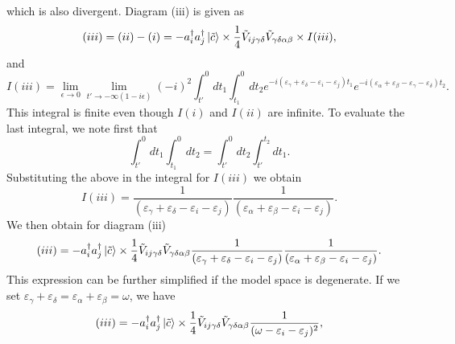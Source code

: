 which is also divergent.  Diagram (iii) is given as
\begin{equation}
   (iii)=(ii)-(i)=
    -a_{i}^{\dagger}a_{j}^{\dagger}
	       \left| \tilde{c} \right\rangle\times\frac{1}{4}\tilde{V}_{ij\gamma\delta}
               \tilde{V}_{\gamma\delta\alpha\beta}\times I(iii),
\end{equation}
and
\begin{equation}
  I(iii)=
  \lim_{\epsilon \rightarrow 0}
   \lim_{t'\rightarrow -\infty (1-i\epsilon )}
   {\displaystyle (-i)^2
   \int_{t'}^{0}dt_1  \int_{t_1}^{0}dt_2}
   e^{-i(\varepsilon_{\gamma}+\varepsilon_{\delta}-\varepsilon_{i}
   -\varepsilon_{j})t_1}
      e^{-i(\varepsilon_{\alpha}+\varepsilon_{\beta}-\varepsilon_{\gamma}
   -\varepsilon_{\delta})t_2}.
\end{equation}
This integral is finite even though $I(i)$ and $I(ii)$ are
infinite. To evaluate the last integral, we note first
that
\begin{equation}
   \int_{t'}^{0}dt_1  \int_{t_1}^{0}dt_2
   =   \int_{t'}^{0}dt_2  \int_{t'}^{t_2}dt_1.
\end{equation}
Substituting the above in the integral for $I(iii)$ we obtain
\begin{equation}
  I(iii)=\frac{1}{(\varepsilon_{\gamma}+\varepsilon_{\delta}-
                   \varepsilon_{i}-\varepsilon_{j})}
          \frac{1}{(\varepsilon_{\alpha}+\varepsilon_{\beta}-
                   \varepsilon_{i}-\varepsilon_{j})}.
\end{equation}
We then obtain for diagram (iii)
\begin{equation}
   (iii)=
    -a_{i}^{\dagger}a_{j}^{\dagger}
	       \left| \tilde{c} \right\rangle\times\frac{1}{4}\tilde{V}_{ij\gamma\delta}
               \tilde{V}_{\gamma\delta\alpha\beta}
             \frac{1}{(\varepsilon_{\gamma}+\varepsilon_{\delta}-
                   \varepsilon_{i}-\varepsilon_{j})}
          \frac{1}{(\varepsilon_{\alpha}+\varepsilon_{\beta}-
                   \varepsilon_{i}-\varepsilon_{j})}.
\end{equation}
This expression can be further simplified if the model space
is degenerate. If we set
$\varepsilon_{\gamma}+\varepsilon_{\delta}=
\varepsilon_{\alpha}+\varepsilon_{\beta}=\omega$, we have
\begin{equation}
   (iii)=
    -a_{i}^{\dagger}a_{j}^{\dagger}
	       \left| \tilde{c} \right\rangle\times\frac{1}{4}\tilde{V}_{ij\gamma\delta}
               \tilde{V}_{\gamma\delta\alpha\beta}
             \frac{1}{(\omega -
                   \varepsilon_{i}-\varepsilon_{j})^2},
         \label{eq:wavefex6}
\end{equation}
